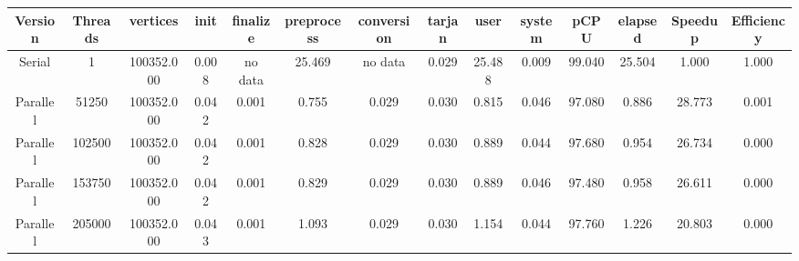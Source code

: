 \begin{tabular}{|c|c|c|c|c|c|c|c|c|c|c|c|c|c|}
\toprule
 Version &  Threads &   vertices &  init & finalize &  preprocess & conversion &  tarjan &   user &  system &   pCPU &  elapsed &  Speedup &  Efficiency \\
\midrule
  Serial &        1 & 100352.000 & 0.008 &  no data &      25.469 &    no data &   0.029 & 25.488 &   0.009 & 99.040 &   25.504 &    1.000 &       1.000 \\
Parallel &    51250 & 100352.000 & 0.042 &    0.001 &       0.755 &      0.029 &   0.030 &  0.815 &   0.046 & 97.080 &    0.886 &   28.773 &       0.001 \\
Parallel &   102500 & 100352.000 & 0.042 &    0.001 &       0.828 &      0.029 &   0.030 &  0.889 &   0.044 & 97.680 &    0.954 &   26.734 &       0.000 \\
Parallel &   153750 & 100352.000 & 0.042 &    0.001 &       0.829 &      0.029 &   0.030 &  0.889 &   0.046 & 97.480 &    0.958 &   26.611 &       0.000 \\
Parallel &   205000 & 100352.000 & 0.043 &    0.001 &       1.093 &      0.029 &   0.030 &  1.154 &   0.044 & 97.760 &    1.226 &   20.803 &       0.000 \\
\bottomrule
\end{tabular}
